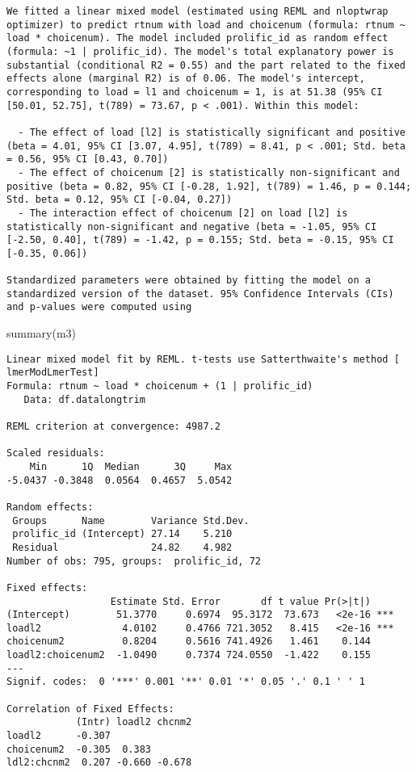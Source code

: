 \documentclass[
]{article}
\newenvironment{Shaded}{\begin{snugshade}}{\end{snugshade}}
\newcommand{\FunctionTok}[1]{\textcolor[rgb]{0.00,0.00,0.00}{#1}}
\newcommand{\NormalTok}[1]{#1}
\begin{document}
\begin{verbatim}
We fitted a linear mixed model (estimated using REML and nloptwrap optimizer) to predict rtnum with load and choicenum (formula: rtnum ~ load * choicenum). The model included prolific_id as random effect (formula: ~1 | prolific_id). The model's total explanatory power is substantial (conditional R2 = 0.55) and the part related to the fixed effects alone (marginal R2) is of 0.06. The model's intercept, corresponding to load = l1 and choicenum = 1, is at 51.38 (95% CI [50.01, 52.75], t(789) = 73.67, p < .001). Within this model:

  - The effect of load [l2] is statistically significant and positive (beta = 4.01, 95% CI [3.07, 4.95], t(789) = 8.41, p < .001; Std. beta = 0.56, 95% CI [0.43, 0.70])
  - The effect of choicenum [2] is statistically non-significant and positive (beta = 0.82, 95% CI [-0.28, 1.92], t(789) = 1.46, p = 0.144; Std. beta = 0.12, 95% CI [-0.04, 0.27])
  - The interaction effect of choicenum [2] on load [l2] is statistically non-significant and negative (beta = -1.05, 95% CI [-2.50, 0.40], t(789) = -1.42, p = 0.155; Std. beta = -0.15, 95% CI [-0.35, 0.06])

Standardized parameters were obtained by fitting the model on a standardized version of the dataset. 95% Confidence Intervals (CIs) and p-values were computed using 
\end{verbatim}

\begin{Shaded}
\begin{Highlighting}[]
\FunctionTok{summary}\NormalTok{(m3)}
\end{Highlighting}
\end{Shaded}

\begin{verbatim}
Linear mixed model fit by REML. t-tests use Satterthwaite's method [
lmerModLmerTest]
Formula: rtnum ~ load * choicenum + (1 | prolific_id)
   Data: df.datalongtrim

REML criterion at convergence: 4987.2

Scaled residuals: 
    Min      1Q  Median      3Q     Max 
-5.0437 -0.3848  0.0564  0.4657  5.0542 

Random effects:
 Groups      Name        Variance Std.Dev.
 prolific_id (Intercept) 27.14    5.210   
 Residual                24.82    4.982   
Number of obs: 795, groups:  prolific_id, 72

Fixed effects:
                  Estimate Std. Error       df t value Pr(>|t|)    
(Intercept)        51.3770     0.6974  95.3172  73.673   <2e-16 ***
loadl2              4.0102     0.4766 721.3052   8.415   <2e-16 ***
choicenum2          0.8204     0.5616 741.4926   1.461    0.144    
loadl2:choicenum2  -1.0490     0.7374 724.0550  -1.422    0.155    
---
Signif. codes:  0 '***' 0.001 '**' 0.01 '*' 0.05 '.' 0.1 ' ' 1

Correlation of Fixed Effects:
            (Intr) loadl2 chcnm2
loadl2      -0.307              
choicenum2  -0.305  0.383       
ldl2:chcnm2  0.207 -0.660 -0.678
\end{verbatim}
\end{document}
